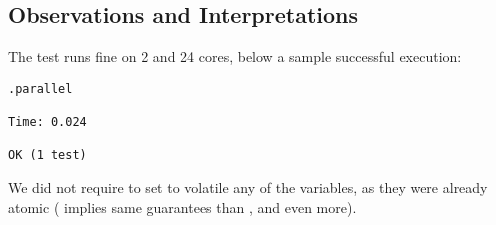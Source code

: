\subsection{Observations and Interpretations}

The test runs fine on 2 and 24 cores, below a sample successful
execution:

\begin{verbatim}
.parallel

Time: 0.024

OK (1 test)
\end{verbatim}
\hfill

We did not require to set to volatile any of the variables, as they were already
atomic ( implies same guarantees than , and even more).

